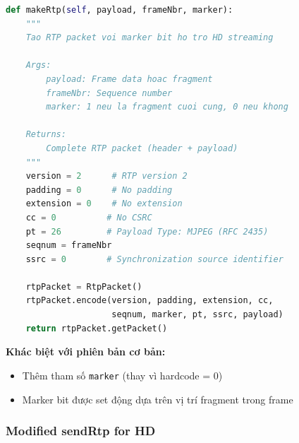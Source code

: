 \documentclass[a4paper,12pt]{article}
\begin{document}
\begin{lstlisting}[language=Python, caption={Make RTP Packet with Marker Bit}]
def makeRtp(self, payload, frameNbr, marker):
    """
    Tao RTP packet voi marker bit ho tro HD streaming
    
    Args:
        payload: Frame data hoac fragment
        frameNbr: Sequence number
        marker: 1 neu la fragment cuoi cung, 0 neu khong
    
    Returns:
        Complete RTP packet (header + payload)
    """
    version = 2      # RTP version 2
    padding = 0      # No padding
    extension = 0    # No extension
    cc = 0          # No CSRC
    pt = 26         # Payload Type: MJPEG (RFC 2435)
    seqnum = frameNbr
    ssrc = 0        # Synchronization source identifier
    
    rtpPacket = RtpPacket()
    rtpPacket.encode(version, padding, extension, cc, 
                     seqnum, marker, pt, ssrc, payload)
    return rtpPacket.getPacket()
\end{lstlisting}

\textbf{Khác biệt với phiên bản cơ bản:}
\begin{itemize}
    \item Thêm tham số \texttt{marker} (thay vì hardcode = 0)
    \item Marker bit được set động dựa trên vị trí fragment trong frame
\end{itemize}

\subsubsection{Modified sendRtp for HD}
\end{document}
